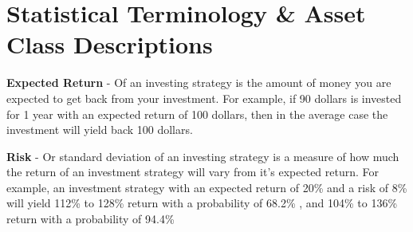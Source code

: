 \documentclass{article}
\begin{document}
\section{Statistical Terminology \& Asset Class Descriptions}

\textbf{Expected Return} - Of an investing strategy is the amount of money you are expected to get back from your investment. For example, if 90 dollars is invested for 1 year with an expected return of 100 dollars, then in the average case the investment will yield back 100 dollars.


\vspace{.5cm}

\noindent \textbf{Risk} - Or standard deviation of an investing strategy is a measure of how much the return of an investment strategy will vary from it's expected return. For example, an investment strategy with an expected return of 20\% and a risk of 8\% will yield 112\% to 128\% return with a probability of 68.2\% , and 104\% to 136\% return with a probability of 94.4\%
\end{document}
